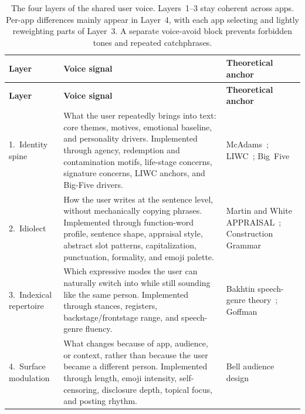 \documentclass[]{fairmeta}
\begin{document}
{\footnotesize
\begin{longtable}{p{}p{}p{}}
  \caption{The four layers of the shared user voice. Layers~1--3 stay coherent across apps. Per-app differences mainly appear in Layer~4, with each app selecting and lightly reweighting parts of Layer~3. A separate voice-avoid block prevents forbidden tones and repeated catchphrases.}
  \label{table:voice_layers} \\
  \toprule
  \textbf{Layer} & \textbf{Voice signal} & \textbf{Theoretical anchor} \\
  \midrule
  \endfirsthead

  \toprule
  \textbf{Layer} & \textbf{Voice signal} & \textbf{Theoretical anchor} \\
  \midrule
  \endhead

  \midrule
  \endfoot

  \bottomrule
  \endlastfoot

  1.\ Identity spine & What the user repeatedly brings into text: core themes, motives, emotional baseline, and personality drivers. Implemented through agency, redemption and contamination motifs, life-stage concerns, signature concerns, LIWC anchors, and Big-Five drivers. & McAdams~\citep{mcadams1985power}; LIWC~\citep{pennebaker2015development}; Big~Five~\citep{mccrae1992introduction} \\[2pt]

  2.\ Idiolect & How the user writes at the sentence level, without mechanically copying phrases. Implemented through function-word profile, sentence shape, appraisal style, abstract slot patterns, capitalization, punctuation, formality, and emoji palette. & Martin and White APPRAISAL~\citep{martin2005language}; Construction Grammar~\citep{goldberg1995constructions} \\[2pt]

  3.\ Indexical repertoire & Which expressive modes the user can naturally switch into while still sounding like the same person. Implemented through stances, registers, backstage/frontstage range, and speech-genre fluency. & Bakhtin speech-genre theory~\citep{bakhtin1986speech}; Goffman~\citep{goffman1959presentation} \\[2pt]

  4.\ Surface modulation & What changes because of app, audience, or context, rather than because the user became a different person. Implemented through length, emoji intensity, self-censoring, disclosure depth, topical focus, and posting rhythm. & Bell audience design~\citep{bell1984language} \\
\end{longtable}
}
\end{document}
